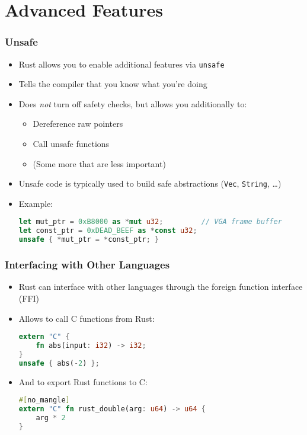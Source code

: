 \section{Advanced Features}

\begin{frame}[fragile]
    \frametitle{Unsafe}

    \begin{itemize}
        \item Rust allows you to enable additional features via \texttt{unsafe}
        \item Tells the compiler that you know what you're doing
        \item Does \emph{not} turn off safety checks, but allows you additionally to:
        \begin{itemize}
            \item Dereference raw pointers
            \item Call unsafe functions
            \item (Some more that are less important)
        \end{itemize}
        \item Unsafe code is typically used to build safe abstractions (\texttt{Vec}, \texttt{String}, \dots)
        \item Example:
        \begin{lstlisting}[language=rust]
let mut_ptr = 0xB8000 as *mut u32;         // VGA frame buffer
let const_ptr = 0xDEAD_BEEF as *const u32;
unsafe { *mut_ptr = *const_ptr; }
        \end{lstlisting}
    \end{itemize}
\end{frame}

\begin{frame}[fragile]
    \frametitle{Interfacing with Other Languages}

    \begin{itemize}
        \item Rust can interface with other languages through the foreign function interface (FFI)
        \item Allows to call C functions from Rust:
        \begin{lstlisting}[language=rust]
extern "C" {
    fn abs(input: i32) -> i32;
}
unsafe { abs(-2) };
        \end{lstlisting}

        \pause

        \item And to export Rust functions to C:
        \begin{lstlisting}[language=rust]
#[no_mangle]
extern "C" fn rust_double(arg: u64) -> u64 {
    arg * 2
}
        \end{lstlisting}
    \end{itemize}
\end{frame}

